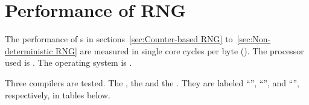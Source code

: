 %
%
%
%

\chapter{Performance of RNG}
\label{chap:Performance of RNG}

The performance of \rng{}s in sections~\ref{sec:Counter-based RNG}
to~\ref{sec:Non-deterministic RNG} are measured in single core cycles per byte
(\cpb). The processor used is \cpuversion. The operating system is \osversion.

Three compilers are tested. The \llvmversion, the \gnuversion and the
\intelversion. They are labeled ``\llvm'', ``\gnu'', and ``\intel'',
respectively, in tables below.

